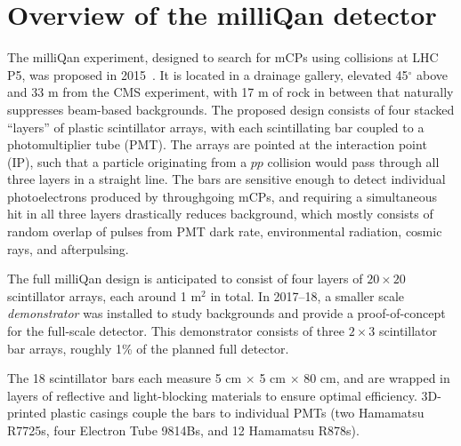 {\section{Overview of the milliQan detector}
The milliQan experiment, designed to search for mCPs using collisions at LHC P5, was proposed in 
2015~\cite{Haas:mcp,mq:loi}. It is located in a drainage gallery, elevated 45$^\circ$ above and 33
m from the CMS experiment, with 17 m of rock in between that naturally
suppresses beam-based backgrounds. The proposed design consists of four stacked ``layers'' of plastic 
scintillator arrays, with each scintillating bar coupled to a photomultiplier tube (PMT).
The arrays are pointed at the interaction point (IP), such that a particle originating
from a $pp$ collision would pass through all three layers in a straight line.
The bars are sensitive enough to detect individual photoelectrons produced by
throughgoing mCPs, and requiring a simultaneous hit in all three layers drastically
reduces background, which mostly consists of random overlap of pulses from
PMT dark rate, environmental radiation, cosmic rays, and afterpulsing.

The full milliQan design is anticipated to consist of four layers of $20\times20$ scintillator arrays,
each around 1 m$^2$ in total. In 2017--18, a smaller scale \textit{demonstrator} was installed
to study backgrounds and provide a proof-of-concept for the full-scale detector.
This demonstrator consists of three $2\times3$ scintillator bar arrays, roughly 1\%
of the planned full detector.

The 18 scintillator bars each measure 5 cm $\times$ 5 cm $\times$ 80 cm, and are
wrapped in layers of reflective and light-blocking materials to ensure optimal
efficiency. 3D-printed plastic casings couple the bars to individual PMTs
(two Hamamatsu R7725s, four Electron Tube 9814Bs, and 12 Hamamatsu R878s).

}
